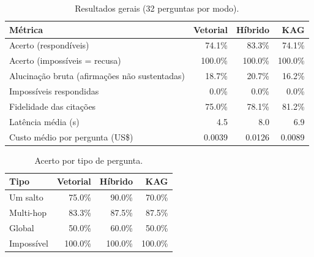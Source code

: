 \begin{table}[ht]\centering\small
\caption{Resultados gerais (32 perguntas por modo).}\label{tab:geral}
\begin{tabular}{lrrr}\hline
Métrica & Vetorial & Híbrido & KAG \\ \hline
Acerto (respondíveis) & 74.1\% & 83.3\% & 74.1\% \\
Acerto (impossíveis = recusa) & 100.0\% & 100.0\% & 100.0\% \\
Alucinação bruta (afirmações não sustentadas) & 18.7\% & 20.7\% & 16.2\% \\
Impossíveis respondidas & 0.0\% & 0.0\% & 0.0\% \\
Fidelidade das citações & 75.0\% & 78.1\% & 81.2\% \\
Latência média (s) & 4.5 & 8.0 & 6.9 \\
Custo médio por pergunta (US\$) & 0.0039 & 0.0126 & 0.0089 \\
\hline\end{tabular}\end{table}
\begin{table}[ht]\centering\small
\caption{Acerto por tipo de pergunta.}\label{tab:tipos}
\begin{tabular}{lrrr}\hline
Tipo & Vetorial & Híbrido & KAG \\ \hline
Um salto & 75.0\% & 90.0\% & 70.0\% \\
Multi-hop & 83.3\% & 87.5\% & 87.5\% \\
Global & 50.0\% & 60.0\% & 50.0\% \\
Impossível & 100.0\% & 100.0\% & 100.0\% \\
\hline\end{tabular}\end{table}
